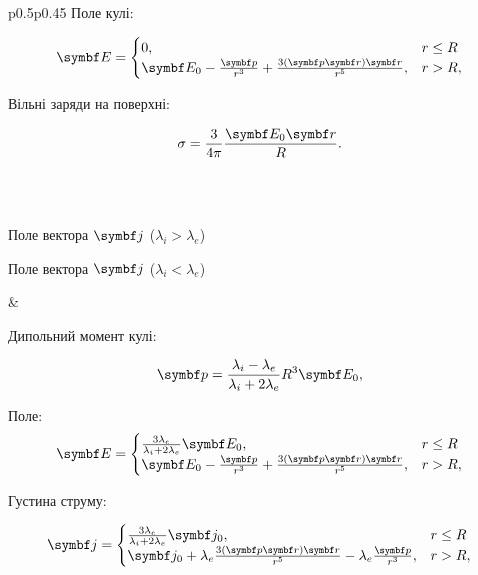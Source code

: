 \begin{center}
\begin{longtable}{p{}p{}}
		Поле кулі:

		\[
			\Efield =
			\begin{cases}
				0,                                                                                      & r \le R \\
				\Efield_0 - \frac{\vect{p}}{r^3} + \frac{3\left(\vect{p}\vect{r}\right)\vect{r} }{r^5}, & r > R,
			\end{cases}
		\]

		Вільні заряди на поверхні:

		\[\sigma = \frac{3}{4\pi} \frac{\Efield_0\vect{r}}{R}.\]

		\\
		                    \\


		\begin{center}
			Поле вектора $\vect{j}$ ($\lambda_i > \lambda_e$)
		\end{center}

		\begin{center}
			
		\end{center}

		\begin{center}
			Поле вектора $\vect{j}$ ($\lambda_i < \lambda_e$)
		\end{center}

		\begin{center}
			
		\end{center}

		 &

		Дипольний момент кулі:

		\[\vect{p} = \frac{\lambda_i - \lambda_e}{\lambda_i + 2\lambda_e}R^3\Efield_0,\]

		Поле:
		\[
			\Efield =
			\begin{cases}
				\frac{3\lambda_e}{\lambda_i + 2\lambda_e} \Efield_0,                                    & r \le R \\
				\Efield_0 - \frac{\vect{p}}{r^3} + \frac{3\left(\vect{p}\vect{r}\right)\vect{r} }{r^5}, & r > R,
			\end{cases}
		\]

		Густина струму:

		\[
			\vect{j} =
			\begin{cases}
				\frac{3\lambda_e}{\lambda_i + 2\lambda_e} \vect{j}_0,                                                       & r \le R \\
				\vect{j}_0  + \lambda_e\frac{3\left(\vect{p}\vect{r}\right)\vect{r} }{r^5} - \lambda_e\frac{\vect{p}}{r^3}, & r > R,
			\end{cases}
		\]


\end{longtable}
\end{center}
